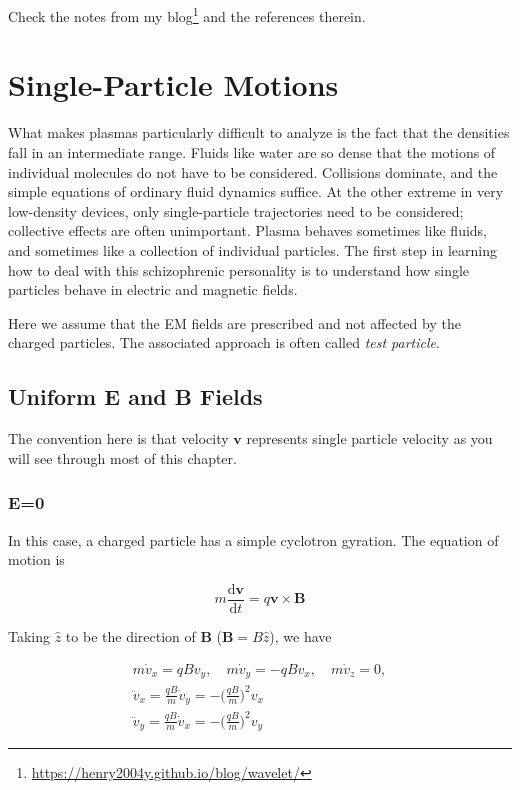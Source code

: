 \documentclass[
  notoc %
]{tufte-book}
\DeclareRobustCommand{\href}[2]{#2\footnote{\url{#1}}}
\begin{document}
Check the \href{https://henry2004y.github.io/blog/wavelet/}{notes from
my blog} and the references therein.

\hypertarget{sec:single}{%
\chapter{Single-Particle Motions}\label{sec:single}}

What makes plasmas particularly difficult to analyze is the fact that
the densities fall in an intermediate range. Fluids like water are so
dense that the motions of individual molecules do not have to be
considered. Collisions dominate, and the simple equations of ordinary
fluid dynamics suffice. At the other extreme in very low-density
devices, only single-particle trajectories need to be considered;
collective effects are often unimportant. Plasma behaves sometimes like
fluids, and sometimes like a collection of individual particles. The
first step in learning how to deal with this schizophrenic personality
is to understand how single particles behave in electric and magnetic
fields.

Here we assume that the EM fields are prescribed and not affected by the
charged particles. The associated approach is often called \emph{test
particle}.

\hypertarget{uniform-e-and-b-fields}{%
\section{Uniform E and B Fields}\label{uniform-e-and-b-fields}}

The convention here is that velocity \(\mathbf{v}\) represents single
particle velocity as you will see through most of this chapter.

\hypertarget{e0}{%
\subsection{E=0}\label{e0}}

In this case, a charged particle has a simple cyclotron gyration. The
equation of motion is

\[
m\frac{\mathrm{d}\mathbf{v}}{\mathrm{d}t} = q\mathbf{v}\times\mathbf{B}
\]

Taking \(\widehat{z}\) to be the direction of \(\mathbf{B}\)
(\(\mathbf{B} = B\widehat{z}\)), we have

\[
\begin{aligned}
m\dot{v}_x = qB v_y,\quad m\dot{v}_y = -qB v_x,\quad m\dot{v}_z = 0, \\
\ddot{v}_x = \frac{qB}{m}\dot{v}_y = -\Big( \frac{qB}{m}\Big)^2 v_x \\
\ddot{v}_y = \frac{qB}{m}\dot{v}_x = -\Big( \frac{qB}{m}\Big)^2 v_y
\end{aligned}
\]
\end{document}
